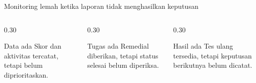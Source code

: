 \begin{frame}{Monitoring lemah ketika laporan tidak menghasilkan keputusan}
  \begin{columns}[T,onlytextwidth]
    \begin{column}{0.30\textwidth}
      \begin{block}{Data ada}
        Skor dan aktivitas tercatat, tetapi belum diprioritaskan.
      \end{block}
    \end{column}
    \begin{column}{0.30\textwidth}
      \begin{block}{Tugas ada}
        Remedial diberikan, tetapi status selesai belum diperiksa.
      \end{block}
    \end{column}
    \begin{column}{0.30\textwidth}
      \begin{block}{Hasil ada}
        Tes ulang tersedia, tetapi keputusan berikutnya belum dicatat.
      \end{block}
    \end{column}
  \end{columns}
  \vspace{0.26cm}
\end{frame}

